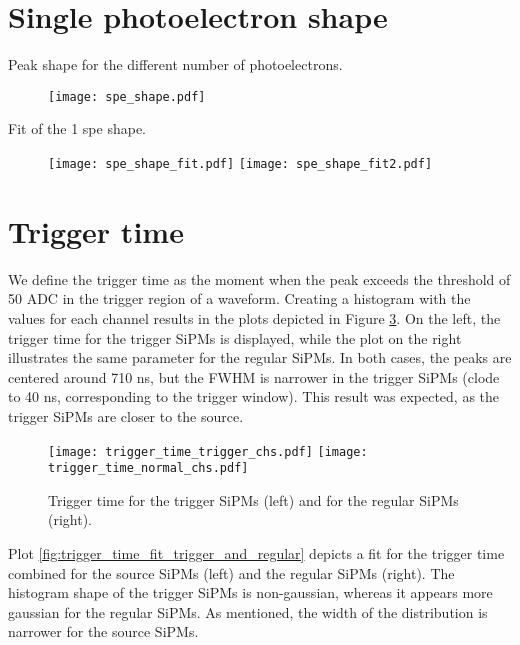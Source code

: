 \documentclass[11pt,a4paper,english,oneside, pdf]{article}
\begin{document}
	
	
	\section{Single photoelectron shape}
	
	Peak shape for the different number of photoelectrons.
	
	\begin{figure}[!h]
		\begin{center}
			\texttt{[image: spe\_shape.pdf]}
			\caption{}
			\label{fig:spe_shape}
		\end{center}
	\end{figure}
	
	Fit of the 1 spe shape.
	
	\begin{figure}[!h]
		\centering
		\texttt{[image: spe\_shape\_fit.pdf]}
		\texttt{[image: spe\_shape\_fit2.pdf]}
		\caption{}
		\label{fig:spe_shape_fit}
	\end{figure}
	
	\section{Trigger time}
	
	We define the trigger time as the moment when the peak exceeds the threshold of 50 ADC in the trigger region of a waveform. Creating a histogram with the values for each channel results in the plots depicted in Figure \ref{fig:trigger_time}. On the left, the trigger time for the trigger SiPMs is displayed, while the plot on the right illustrates the same parameter for the regular SiPMs. In both cases, the peaks are centered around 710 ns, but the FWHM is narrower in the trigger SiPMs (clode to 40 ns, corresponding to the trigger window). This result was expected, as the trigger SiPMs are closer to the source.
	
	\begin{figure}[!h]
		\centering
		\texttt{[image: trigger\_time\_trigger\_chs.pdf]}
		\texttt{[image: trigger\_time\_normal\_chs.pdf]}
		\caption{Trigger time for the trigger SiPMs (left) and for the regular SiPMs (right).}
		\label{fig:trigger_time}
	\end{figure}

	
	Plot \ref{fig:trigger_time_fit_trigger_and_regular} depicts a fit for the trigger time combined for the source SiPMs (left) and the regular SiPMs (right). The histogram shape of the trigger SiPMs is non-gaussian, whereas it appears more gaussian for the regular SiPMs. As mentioned, the width of the distribution is narrower for the source SiPMs.
	
\end{document}
